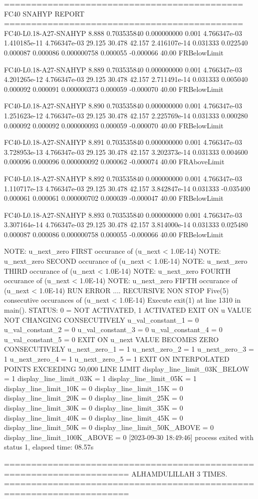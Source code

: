 ============================================
FC40 SNAHYP REPORT
============================================
FC40-L0.18-A27-SNAHYP  8.888  0.703535840  0.000000000  0.001 4.766347e-03  1.410185e-11  4.766347e-03   29.125  30.478  42.157  2.416107e-14   0.031333   0.022540   0.000087   0.000086  0.000000758   0.000055  -0.000066  40.00 FRBelowLimit 

FC40-L0.18-A27-SNAHYP  8.889  0.703535840  0.000000000  0.001 4.766347e-03  4.201265e-12  4.766347e-03   29.125  30.478  42.157  2.711491e-14   0.031333   0.005040   0.000092   0.000091  0.000000373   0.000059  -0.000070  40.00 FRBelowLimit 

FC40-L0.18-A27-SNAHYP  8.890  0.703535840  0.000000000  0.001 4.766347e-03  1.251623e-12  4.766347e-03   29.125  30.478  42.157  2.225769e-14   0.031333   0.000280   0.000092   0.000092  0.000000093   0.000059  -0.000070  40.00 FRBelowLimit 

FC40-L0.18-A27-SNAHYP  8.891  0.703535840  0.000000000  0.001 4.766347e-03  3.728953e-13  4.766347e-03   29.125  30.478  42.157  3.202373e-14   0.031333   0.004600   0.000096   0.000096  0.000000092   0.000062  -0.000074  40.00 FRAboveLimit 

FC40-L0.18-A27-SNAHYP  8.892  0.703535840  0.000000000  0.001 4.766347e-03  1.110717e-13  4.766347e-03   29.125  30.478  42.157  3.842847e-14   0.031333  -0.035400   0.000061   0.000061  0.000000702   0.000039  -0.000047  40.00 FRBelowLimit 

FC40-L0.18-A27-SNAHYP  8.893  0.703535840  0.000000000  0.001 4.766347e-03  3.307164e-14  4.766347e-03   29.125  30.478  42.157  3.814000e-14   0.031333   0.025480   0.000087   0.000086  0.000000758   0.000055  -0.000066  40.00 FRBelowLimit 

 NOTE: u_next_zero FIRST  occurance of (u_next < 1.0E-14)
 NOTE: u_next_zero SECOND occurance of (u_next < 1.0E-14)
 NOTE: u_next_zero THIRD  occurance of (u_next < 1.0E-14)
 NOTE: u_next_zero FOURTH occurance of (u_next < 1.0E-14)
 NOTE: u_next_zero FIFTH  occurance of (u_next < 1.0E-14)
 RUN ERROR .... RECURSIVE NON STOP 
 Five(5) consecutive occurances of (u_next < 1.0E-14) 
 Execute exit(1) at line 1310 in main(). 
 STATUS: 0 = NOT ACTIVATED, 1 ACTIVATED 
EXIT ON u VALUE NOT CHANGING CONSECUTIVELY
u_val_constant_1 = 0 
u_val_constant_2 = 0 
u_val_constant_3 = 0 
u_val_constant_4 = 0 
u_val_constant_5 = 0 
EXIT ON u_next VALUE BECOMES ZERO CONSECUTIVELY
u_next_zero_1 = 1 
u_next_zero_2 = 1 
u_next_zero_3 = 1 
u_next_zero_4 = 1 
u_next_zero_5 = 1 
EXIT ON INTERPOLATED POINTS EXCEEDING 50,000 LINE LIMIT
display_line_limit_03K_BELOW = 1 
display_line_limit_03K = 1 
display_line_limit_05K = 1 
display_line_limit_10K = 0 
display_line_limit_15K = 0 
display_line_limit_20K = 0 
display_line_limit_25K = 0 
display_line_limit_30K = 0 
display_line_limit_35K = 0 
display_line_limit_40K = 0 
display_line_limit_45K = 0 
display_line_limit_50K = 0 
display_line_limit_50K_ABOVE = 0 
display_line_limit_100K_ABOVE = 0 
[2023-09-30 18:49:46] process exited with status 1, elapsed time: 08.57s

=====================================================================
ALHAMDULILLAH 3 TIMES.
=====================================================================



